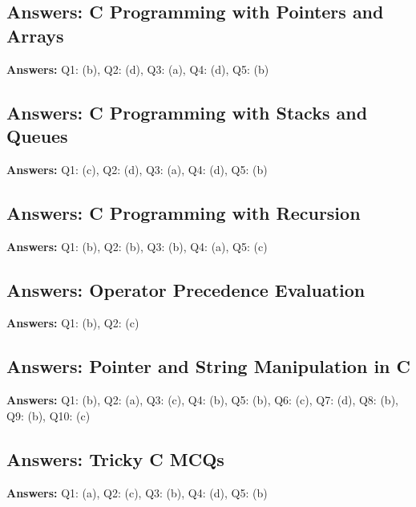 \subsection*{Answers: C Programming with Pointers and Arrays}
\noindent\textbf{Answers:} Q1: (b), Q2: (d), Q3: (a), Q4: (d), Q5: (b)

\subsection*{Answers: C Programming with Stacks and Queues}
\noindent\textbf{Answers:} Q1: (c), Q2: (d), Q3: (a), Q4: (d), Q5: (b)

\subsection*{Answers: C Programming with Recursion}
\noindent\textbf{Answers:} Q1: (b), Q2: (b), Q3: (b), Q4: (a), Q5: (c)

\subsection*{Answers: Operator Precedence Evaluation}
\noindent\textbf{Answers:} Q1: (b), Q2: (c)

\subsection*{Answers: Pointer and String Manipulation in C}
\noindent\textbf{Answers:} Q1: (b), Q2: (a), Q3: (c), Q4: (b), Q5: (b), Q6: (c), Q7: (d), Q8: (b), Q9: (b), Q10: (c)

\subsection*{Answers: Tricky C MCQs}
\noindent \textbf{Answers:} Q1: (a), Q2: (c), Q3: (b), Q4: (d), Q5: (b)